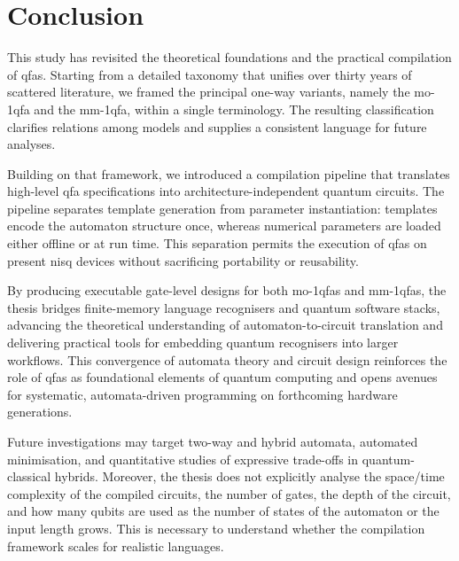 \chapter{Conclusion}
\label{chap:conclusion}

This study has revisited the theoretical foundations and the practical compilation of \glspl{qfa}. Starting from a detailed taxonomy that unifies over thirty years of scattered literature, we framed the principal one-way variants, namely the \gls{mo-1qfa} and the \gls{mm-1qfa}, within a single terminology. The resulting classification clarifies relations among models and supplies a consistent language for future analyses.

Building on that framework, we introduced a compilation pipeline that translates high-level \gls{qfa} specifications into architecture-independent quantum circuits. The pipeline separates template generation from parameter instantiation: templates encode the automaton structure once, whereas numerical parameters are loaded either offline or at run time. This separation permits the execution of \glspl{qfa} on present \gls{nisq} devices without sacrificing portability or reusability.

By producing executable gate-level designs for both \glspl{mo-1qfa} and \glspl{mm-1qfa}, the thesis bridges finite-memory language recognisers and quantum software stacks, advancing the theoretical understanding of automaton-to-circuit translation and delivering practical tools for embedding quantum recognisers into larger workflows. This convergence of automata theory and circuit design reinforces the role of \glspl{qfa} as foundational elements of quantum computing and opens avenues for systematic, automata-driven programming on forthcoming hardware generations.


Future investigations may target two-way and hybrid automata, automated minimisation, and quantitative studies of expressive trade-offs in quantum-classical hybrids. Moreover, the thesis does not explicitly analyse the space/time complexity of the compiled circuits, the number of gates, the depth of the circuit, and how many qubits are used as the number of states of the automaton or the input length grows. This is necessary to understand whether the compilation framework scales for realistic languages. 

